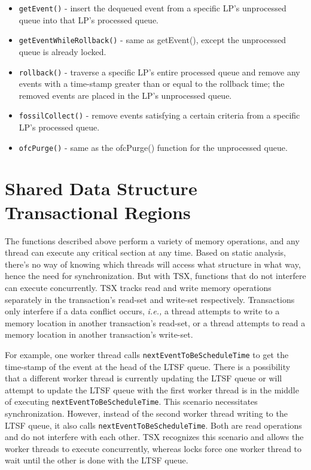 \documentclass[11pt]{book}
\begin{document}
\begin{itemize}
  \item\texttt{getEvent()} - insert the dequeued event from a specific LP's unprocessed
    queue into that LP's processed queue.
  \item\texttt{getEventWhileRollback()} - same as getEvent(), except the unprocessed queue
    is already locked.%
  \item\texttt{rollback()} - traverse a specific LP's entire processed queue and remove
    any events with a time-stamp greater than or equal to the rollback time; the removed
    events are placed in the LP's unprocessed queue.
  \item\texttt{fossilCollect()} - remove events satisfying a certain criteria from a
    specific LP's processed queue.
  \item\texttt{ofcPurge()} - same as the ofcPurge() function for the unprocessed queue.
\end{itemize}

\section{Shared Data Structure Transactional Regions}

The functions described above perform a variety of memory operations, and any thread can
execute any critical section at any time.  Based on static analysis, there's no way of
knowing which threads will access what structure in what way, hence the need for
synchronization.  But with TSX, functions that do not interfere can execute concurrently.
TSX tracks read and write memory operations separately in the transaction's read-set and
write-set respectively.  Transactions only interfere if a data conflict occurs, \emph{i.e.,} a
thread attempts to write to a memory location in another transaction's read-set, or a
thread attempts to read a memory location in another transaction's write-set.

For example, one worker thread calls \texttt{nextEventToBeScheduleTime} to get the
time-stamp of the event at the head of the LTSF queue.  There is a possibility that a
different worker thread is currently updating the LTSF queue or will attempt to update the
LTSF queue with the first worker thread is in the middle of executing
\texttt{nextEventToBeScheduleTime}.  This scenario necessitates synchronization.  However,
instead of the second worker thread writing to the LTSF queue, it also calls
\texttt{nextEventToBeScheduleTime}.  Both are read operations and do not interfere with
each other.  TSX recognizes this scenario and allows the worker threads to execute
concurrently, whereas locks force one worker thread to wait until the other is done with
the LTSF queue.
\end{document}
